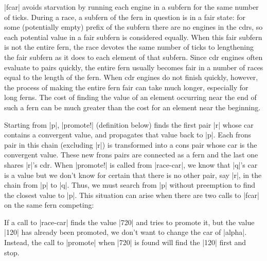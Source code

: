 \scheme|fcar| avoids starvation by running each engine in a subfern for the
same number of ticks. During a race, a subfern of the fern in question
is in a fair state: for some (potentially empty) prefix of the subfern there are no engines in the cdrs, so
each potential value in a fair subfern is considered equally. When this fair
subfern is not the entire fern, the race devotes the same number of
ticks to lengthening the fair subfern as it does to each element of that
subfern. Since cdr engines often evaluate to pairs quickly, the
entire fern usually becomes fair in a number of races equal to the
length of the fern. When cdr engines do not finish quickly, however, the
process of making the entire fern fair can take much longer, especially
for long ferns. The cost of finding the value of an element occurring near
the end of such a fern can be much greater than the cost for an element
near the beginning.


Starting from \scheme|p|, \scheme|promote!| (definition below) finds
the first pair \scheme|r| whose car contains a convergent value, and
propagates that value back to \scheme|p|.  Each frons pair in this
chain (excluding \scheme|r|) is transformed into a cons pair whose car
is the convergent value. These new frons pairs are connected as a fern
and the last one shares \scheme|r|'s cdr.  When \scheme|promote!| is
called from \scheme|race-car|, we know that \scheme|q|'s car is a
value but we don't know for certain that there is no other pair, say
\scheme|r|, in the chain from \scheme|p| to \scheme|q|.  Thus, we must
search from \scheme|p| without preemption to find the closest value to
\scheme|p|.  This situation can arise when there are two calls to
\scheme|fcar| on the same fern competing:

\schemedisplayspace
{}

\wspace

\noindent
If a call to \scheme|race-car| finds the value \schemeresult|720| and
tries to promote it, but the value \schemeresult|120| has already been
promoted, we don't want to change the car of \scheme|alpha|. Instead,
the call to \scheme|promote| when \schemeresult|720| is found will
find the \schemeresult|120| first and stop.


